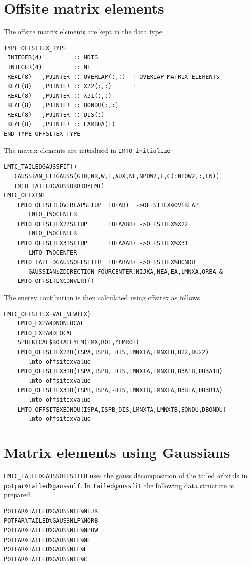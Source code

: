 \documentclass[11pt,a4paper]{report}
\begin{document}
\section{Offsite matrix elements}
The offsite matrix elements are kept in the data type 
\begin{verbatim}
TYPE OFFSITEX_TYPE
 INTEGER(4)         :: NDIS
 INTEGER(4)         :: NF
 REAL(8)   ,POINTER :: OVERLAP(:,:)  ! OVERLAP MATRIX ELEMENTS
 REAL(8)   ,POINTER :: X22(:,:)      !
 REAL(8)   ,POINTER :: X31(:,:)
 REAL(8)   ,POINTER :: BONDU(:,:)
 REAL(8)   ,POINTER :: DIS(:)
 REAL(8)   ,POINTER :: LAMBDA(:)
END TYPE OFFSITEX_TYPE
\end{verbatim}

The matrix elements are initialized in \verb|LMTO_initialize|
\begin{verbatim}
LMTO_TAILEDGAUSSFIT()
   GAUSSIAN_FITGAUSS(GID,NR,W,L,AUX,NE,NPOW2,E,C(:NPOW2,:,LN))
   LMTO_TAILEDGAUSSORBTOYLM()
LMTO_OFFXINT
    LMTO_OFFSITEOVERLAPSETUP  !O(AB)  ->OFFSITEX%OVERLAP
       LMTO_TWOCENTER
    LMTO_OFFSITEX22SETUP      !U(AABB) ->OFFSITEX%X22
       LMTO_TWOCENTER
    LMTO_OFFSITEX31SETUP      !U(AAAB) ->OFFSITEX%X31
       LMTO_TWOCENTER
    LMTO_TAILEDGAUSSOFFSITEU  !U(ABAB) ->OFFSITEX%BONDU
       GAUSSIAN$ZDIRECTION_FOURCENTER(NIJKA,NEA,EA,LMNXA,ORBA &
    LMTO_OFFSITEXCONVERT()
\end{verbatim}

The energy contibution is then calculated using offsitex as follows
\begin{verbatim}
LMTO_OFFSITEXEVAL_NEW(EX)  
    LMTO_EXPANDNONLOCAL
    LMTO_EXPANDLOCAL
    SPHERICAL$ROTATEYLM(LMX,ROT,YLMROT)
    LMTO_OFFSITEX22U(ISPA,ISPB, DIS,LMNXTA,LMNXTB,U22,DU22)
       lmto_offsitexvalue
    LMTO_OFFSITEX31U(ISPA,ISPB, DIS,LMNXTA,LMNXTB,U3A1B,DU3A1B)
       lmto_offsitexvalue
    LMTO_OFFSITEX31U(ISPB,ISPA,-DIS,LMNXTB,LMNXTA,U3B1A,DU3B1A)
       lmto_offsitexvalue
    LMTO_OFFSITEXBONDU(ISPA,ISPB,DIS,LMNXTA,LMNXTB,BONDU,DBONDU)
       lmto_offsitexvalue
\end{verbatim}

\section{Matrix elements using Gaussians}
\verb|LMTO_TAILEDGAUSSOFFSITEU| uses the gauss decomposition of the
tailed orbitals in \verb|potpar%tailed%gaussnlf|.  In
\verb|tailedgaussfit| the following data structure is prepared.
\begin{verbatim}
POTPAR%TAILED%GAUSSNLF%NIJK
POTPAR%TAILED%GAUSSNLF%NORB
POTPAR%TAILED%GAUSSNLF%NPOW
POTPAR%TAILED%GAUSSNLF%NE
POTPAR%TAILED%GAUSSNLF%E
POTPAR%TAILED%GAUSSNLF%C
\end{verbatim}
\end{document}
